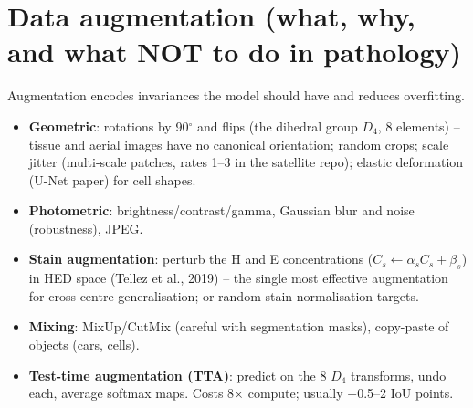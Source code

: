 \section{Data augmentation (what, why, and what NOT to do in pathology)}
Augmentation encodes invariances the model should have and reduces overfitting.
\begin{itemize}
\item \textbf{Geometric}: rotations by 90$^\circ$ and flips (the dihedral group $D_4$, 8 elements) -- tissue and aerial
images have no canonical orientation; random crops; scale jitter (multi-scale patches, rates 1--3 in the satellite repo);
elastic deformation (U-Net paper) for cell shapes.
\item \textbf{Photometric}: brightness/contrast/gamma, Gaussian blur and noise (robustness), JPEG.
\item \textbf{Stain augmentation}: perturb the H and E concentrations ($C_s\leftarrow \alpha_s C_s+\beta_s$) in HED
space (Tellez et al., 2019) -- the single most effective augmentation for cross-centre generalisation; or random
stain-normalisation targets.
\item \textbf{Mixing}: MixUp/CutMix (careful with segmentation masks), copy-paste of objects (cars, cells).
\item \textbf{Test-time augmentation (TTA)}: predict on the 8 $D_4$ transforms, undo each, average softmax maps. Costs
8$\times$ compute; usually +0.5--2 IoU points.
\end{itemize}

